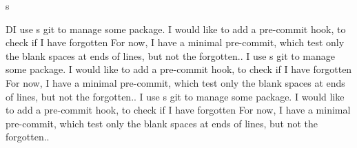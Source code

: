 \documentclass[a4paper, oneside, 12pt]{book}
\begin{document}
s
\newpage

\beginnumbering

\pstart
{}
\pend
\pstart
DI use s git to manage some package.
I would like to add a pre-commit hook, to check if I have forgotten
For now, I have a minimal pre-commit, which test only the blank spaces at ends of lines, but not the forgotten..
\pend
\pstart
{}
\pend
\pstart
{}
\pend
\pstart
{}
\pend
\pstart
{}I use s git to manage some package.
I would like to add a pre-commit hook, to check if I have forgotten
For now, I have a minimal pre-commit, which test only the blank spaces at ends of lines, but not the forgotten..
\pend
\pstart
{}
\pend
\pstart
{}I use s git to manage some package.
I would like to add a pre-commit hook, to check if I have forgotten
For now, I have a minimal pre-commit, which test only the blank spaces at ends of lines, but not the forgotten..
\pend


\endnumbering
\end{document}
